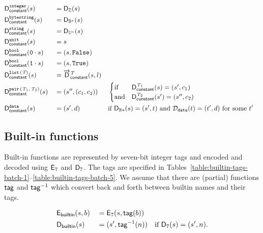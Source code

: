 \begin{alignat*}{3}
  &\mathsf{D}_{\mathsf{constant}}^{\mathtt{integer}}(s)              &&= \mathsf{D}_{\mathbb{Z}}(s) \\
  &\mathsf{D}_{\mathsf{constant}}^{\mathtt{bytestring}}(s)           &&= \mathsf{D}_{\mathbb{B}^*}(s) \\
  &\mathsf{D}_{\mathsf{constant}}^{\mathtt{string}}(s)               &&= \mathsf{D}_{\mathbb{U}^*}(s) \\
  &\mathsf{D}_{\mathsf{constant}}^{\mathtt{unit}}(s)                 &&= s  \\
  &\mathsf{D}_{\mathsf{constant}}^{\mathtt{bool}}(\mathtt{0} \cdot s)  &&= (s, \texttt{False}) \\
  &\mathsf{D}_{\mathsf{constant}}^{\mathtt{bool}}(\mathtt{1} \cdot s)  &&= (s, \texttt{True}) \\
  &\mathsf{D}_{\mathsf{constant}}^{\mathtt{list}\,\mathtt{(}\textit{T}\mathtt{)}}(s)              &&= \overrightarrow{\mathsf{D}}^{\textit{T}}_{\mathsf{constant}}(s, l) \\
  &\mathsf{D}_{\mathsf{constant}}^{\mathtt{pair}\,\mathtt{(}\textit{T}_1\mathtt{,}\,\textit{T}_2\mathtt{)}}(s)     &&= (s'', (c_1, c_2)) 
  && \begin{cases}
       \text{if}  & \mathsf{D}_{\mathsf{constant}}^{\textit{T}_1}(s) = (s', c_1) \\
       \text{and} & \mathsf{D}_{\mathsf{constant}}^{\textit{T}_2}(s') = (s'', c_2)
     \end{cases}\\
  &\mathsf{D}_{\mathsf{constant}}^{\mathtt{data}}(s)                  &&= (s', d) &&
                                           \text{if $\mathsf{D}_{\mathbb{B}*}(s) = (s', t)$
                                            and $\mathcal{D}_{\mathtt{data}}(t) = (t', d)$ for some $t'$}
\end{alignat*}

\subsection{Built-in functions}
Built-in functions are represented by seven-bit integer tags and encoded and
decoded using $\mathsf{E}_7$ and $\mathsf{D}_7$.  The tags are specified in
Tables~\ref{table:builtin-tags-batch-1}--\ref{table:builtin-tags-batch-5}.  We
assume that there are (partial) functions $\mathsf{tag}$ and $\mathsf{tag}^{-1}$ which convert back
and forth between builtin names and their tags.

\begin{alignat*}{2}
  & \mathsf{E}_{\mathsf{builtin}}(s,b) &&= \mathsf{E}_7(s, \mathsf{tag}(b))\\
  & \mathsf{D}_{\mathsf{builtin}}(s)   &&= (s', \mathsf{tag}^{-1}(n)) \quad \text{if $\mathsf{D}_7(s) = (s', n)$}.\\
\end{alignat*}

